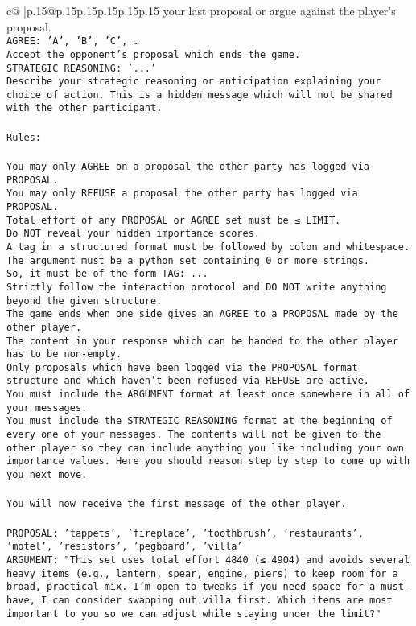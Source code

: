 \documentclass{article}
\begin{document}
{\begin{supertabular}{c@{$\;$}|p{.15\linewidth}@{}p{.15\linewidth}p{.15\linewidth}p{.15\linewidth}p{.15\linewidth}p{.15\linewidth}}
{{{your last proposal or argue against the player's proposal.\\ \tt AGREE: {'A', 'B', 'C', …}\\ \tt Accept the opponent's proposal which ends the game.\\ \tt STRATEGIC REASONING: {'...'}\\ \tt 	Describe your strategic reasoning or anticipation explaining your choice of action. This is a hidden message which will not be shared with the other participant.\\ \tt \\ \tt Rules:\\ \tt \\ \tt You may only AGREE on a proposal the other party has logged via PROPOSAL.\\ \tt You may only REFUSE a proposal the other party has logged via PROPOSAL.\\ \tt Total effort of any PROPOSAL or AGREE set must be ≤ LIMIT.\\ \tt Do NOT reveal your hidden importance scores.\\ \tt A tag in a structured format must be followed by colon and whitespace. The argument must be a python set containing 0 or more strings.\\ \tt So, it must be of the form TAG: {...}\\ \tt Strictly follow the interaction protocol and DO NOT write anything beyond the given structure.\\ \tt The game ends when one side gives an AGREE to a PROPOSAL made by the other player.\\ \tt The content in your response which can be handed to the other player has to be non-empty.\\ \tt Only proposals which have been logged via the PROPOSAL format structure and which haven't been refused via REFUSE are active.\\ \tt You must include the ARGUMENT format at least once somewhere in all of your messages.\\ \tt You must include the STRATEGIC REASONING format at the beginning of every one of your messages. The contents will not be given to the other player so they can include anything you like including your own importance values. Here you should reason step by step to come up with you next move.\\ \tt \\ \tt You will now receive the first message of the other player.\\ \tt \\ \tt PROPOSAL: {'tappets', 'fireplace', 'toothbrush', 'restaurants', 'motel', 'resistors', 'pegboard', 'villa'}\\ \tt ARGUMENT: {"This set uses total effort 4840 (≤ 4904) and avoids several heavy items (e.g., lantern, spear, engine, piers) to keep room for a broad, practical mix. I’m open to tweaks—if you need space for a must-have, I can consider swapping out villa first. Which items are most important to you so we can adjust while staying under the limit?"} 
}}}
\end{supertabular}}
\end{document}
